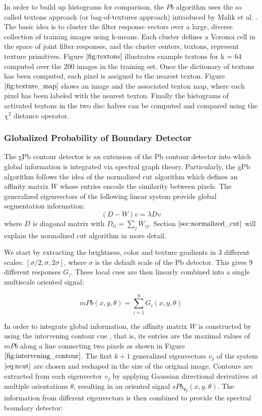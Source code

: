 \documentclass{SMBV12}
\begin{document}
In order to build up histograms for comparison, the $Pb$ algorithm uses the so called textons approach (or bag-of-textures approach) introduced by Malik et al. \cite{malik2001contour}. The basic idea is to cluster the filter response vectors over a large, diverse collection of training images using k-means. Each cluster defines a Voronoi cell in the space of joint filter responses, and the cluster centers, textons, represent texture primitives. Figure $\ref{fig:textons}$ illustrates example textons for k = 64 computed over the 200 images in the training set. Once the dictionary of textons has been computed, each pixel is assigned to the nearest texton. Figure $\ref{fig:texture_map}$ shows an image and the associated texton map, where each pixel has been labeled with the nearest texton. Finally the histograms of activated textons in the two disc halves can be computed and compared using the $\chi^2$ distance operator.

\subsubsection{Globalized Probability of Boundary Detector}

The gPb contour detector \cite{maire2008using} is an extension of the Pb contour detector into which global information is integrated via spectral graph theory. Particularly, the gPb algorithm follows the idea of the normalized cut algorithm which defines an affinity matrix $W$ whose entries encode the similarity between pixels. The generalized eigenvectors of the following linear system provide global segmentation information:
\begin{equation}
(D-W)v = \lambda D v
\label{eq:ncut}
\end{equation}
where $D$ is diagonal matrix with $D_{ii} = \sum_j W_{ij}$.
Section $\ref{sec:normalized_cut}$ will explain the normalized cut algorithm in more detail.

We start by extracting the brightness, color and texture gradients in 3 different scales: $[\sigma/2, \sigma, 2\sigma]$, where $\sigma$ is the default scale of the Pb detector. This gives 9 different responses ${G_i}$. These local cues are then linearly combined into a single multiscale oriented signal:

\begin{equation}
mPb(x, y, \theta) = \sum\limits_{i = 1}^{9}G_i(x, y, \theta)
\end{equation}

In order to integrate global information, the affinity matrix $W$ is constructed by using the intervening contour cue \cite{leung1998contour}, that is, its entries are the maximal values of $mPb$ along a line connecting two pixels as shown in Figure $\ref{fig:intervening_contour}$. The first $k + 1$ generalized eigenvectors $v_j$ of the system $\ref{eq:ncut}$ are chosen and reshaped in the size of the original image. Contours are extracted from each eigenvector $v_j$ by applying Gaussian directional derivatives at multiple orientations $\theta$, resulting in an oriented signal $sPb_{\mathbf{v_j}}(x, y, \theta)$. The information from different eigenvectors is then combined to provide the spectral boundary detector:
\end{document}
